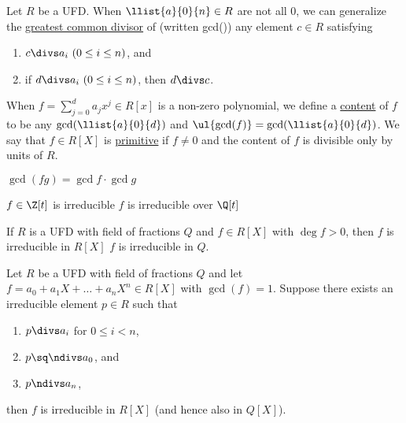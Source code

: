 \documentclass[a4paper]{article}
\begin{document}
\begin{tdefinition}
  Let \( R \) be a UFD.
  When \( \llist{a}{0}{n}\in R \) are not all 0, we can generalize the \ul{greatest common divisor} of  (written gcd()) any element \( c\in R \) satisfying \begin{enumerate}[label=(\roman*)]
    \item \( c\divs a_i\ (0\leq i\leq n) \), and
    \item if \( d\divs a_i\ (0\leq i\leq n) \), then \( d\divs c \).
  \end{enumerate}
  When \( f=\sum_{j=0}^{d}a_jx^j\in R[x] \) is a non-zero polynomial, we define a \ul{content} of \( f \) to be any \( \gcd (\llist{a}{0}{d}) \) and \( \ul{\gcd(f)} = \gcd(\llist{a}{0}{d}) \).
  We say that \( f\in R[X] \) is \ul{primitive} if \( f\neq 0 \) and the content of \( f \) is divisible only by units of \( R \).
\end{tdefinition}

\begin{tlemma}[Gauss]
  \( \gcd(fg) = \gcd f \cdot \gcd g\)
\end{tlemma}

\begin{tcorollary}
  \( f\in\Z[t] \) is irreducible \iff \( f \) is irreducible over \( \Q[t] \)
\end{tcorollary}

\begin{tcorollary}
  If \( R \) is a UFD with field of fractions \( Q \) and \( f \in R[X] \) with \( \deg f > 0 \), then \( f \) is irreducible in \( R[X] \) \iff \( f \) is irreducible in \( Q \).
\end{tcorollary}

\begin{ttheorem}
  Let \( R \) be a UFD with field of fractions \( Q \) and let \( f=a_0+a_1X+\ldots +a_nX^n \in R[X] \) with \( \gcd(f) = 1 \).
  Suppose there exists an irreducible element \( p \in R \) such that
  \begin{enumerate}[label=(\roman*)]
    \item \( p\divs a_i \) for \( 0\leq i < n \),
    \item \( p\sq \ndivs a_0 \), and
    \item \( p\ndivs a_n \),
  \end{enumerate}
  then \( f \) is irreducible in \( R[X] \) (and hence also in \( Q[X] \)).
\end{ttheorem}
\end{document}
